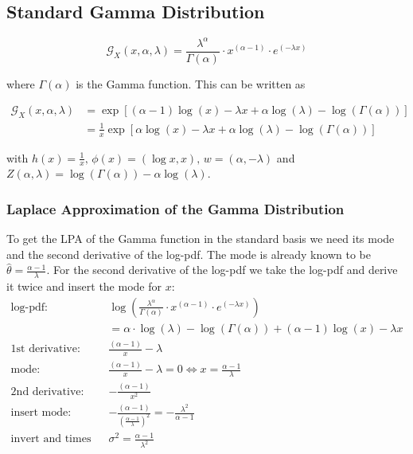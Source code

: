 \subsection{Standard Gamma Distribution}

\begin{equation}
	\mathcal{G}_X(x, \alpha, \lambda) = \frac{\lambda^\alpha}{\Gamma(\alpha)} \cdot x^{(\alpha - 1)} \cdot e^{(-\lambda x)}
	\label{eq:gamma_pdf}
\end{equation}

where $\Gamma(\alpha)$ is the Gamma function. This can be written as

\begin{align}
	\mathcal{G}_X(x, \alpha, \lambda) &= \exp \left[(\alpha -1)\log(x) - \lambda x + \alpha \log(\lambda) - \log(\Gamma(\alpha))\right] \\
	&= \frac{1}{x} \exp\left[\alpha\log(x) - \lambda x + \alpha \log(\lambda) - \log(\Gamma(\alpha))\right]
	\label{eq:gamma_exp_family}
\end{align}

with $h(x) = \frac{1}{x},\, \phi(x)=(\log x, x),\, w=(\alpha, -\lambda)$ and $Z(\alpha, \lambda) = \log(\Gamma(\alpha)) - \alpha  \log(\lambda)$. 

\subsubsection{Laplace Approximation of the Gamma Distribution}

To get the LPA of the Gamma function in the standard basis we need its mode and the second derivative of the log-pdf. The mode is already known to be $\hat{\theta} = \frac{\alpha -1}{\lambda}$. For the second derivative of the log-pdf we take the log-pdf and derive it twice and insert the mode for $x$:
\begin{align*}
	\text{log-pdf: } &\log\left( \frac{\lambda^\alpha}{\Gamma(\alpha)} \cdot x^{(\alpha - 1)} \cdot e^{(-\lambda x)}\right) \\
	&= \alpha \cdot \log(\lambda) - \log(\Gamma(\alpha)) + (\alpha -1)\log(x) -\lambda x\\
	\text{1st derivative: }& \frac{(\alpha-1)}{x} - \lambda \\
	\text{mode: }&  \frac{(\alpha-1)}{x} - \lambda = 0 \Leftrightarrow x=\frac{\alpha -1}{\lambda}\\
	\text{2nd derivative: }& -\frac{(\alpha-1)}{x^2}\\
	\text{insert mode: }& -\frac{(\alpha-1)}{(\frac{\alpha -1}{\lambda})^2} = -\frac{\lambda^2}{\alpha - 1} \\
	\text{invert and times -1: }&\sigma^2 = \frac{\alpha-1}{\lambda^2}
\end{align*}


